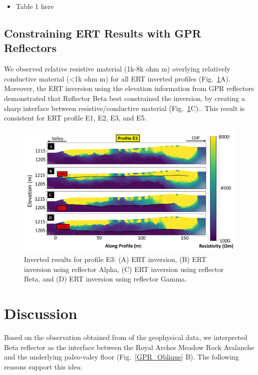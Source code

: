 \documentclass[5p]{elsarticle}
\begin{document}
\begin{itemize}
    \item Table 1 here
\end{itemize}			   

								   
\subsection{Constraining ERT Results with GPR Reflectors}

We observed relative resistive material (1k-8k ohm m) overlying relatively conductive material (<1k ohm m) for all ERT inverted profiles (Fig.~\ref{ERT_inversion}A). Moreover, the ERT inversion using the elevation information from GPR reflectors demonstrated that Reflector Beta best constrained the inversion, by creating a sharp interface between resistive/conductive material (Fig.~\ref{ERT_inversion}C).. This result is consistent for ERT profile E1, E2, E3, and E5. 

							 \begin{figure}[h]

	\includegraphics[width=\textwidth]{Figures/ERT_inversion.pdf}
		\caption{Inverted results for profile E3: (A) ERT inversion, (B) ERT inversion using reflector Alpha, (C) ERT inversion using reflector Beta, and (D) ERT inversion using reflector Gamma.\label{ERT_inversion}}

								   \end{figure}

\bigskip


\section{Discussion}

Based on the observation obtained from of the geophysical data, we interpreted Beta reflector as the interface between the Royal Arches Meadow Rock Avalanche and the underlying paleo-valey floor (Fig.~\ref{GPR_Oblique} B). The following reasons support this idea: 
\end{document}
